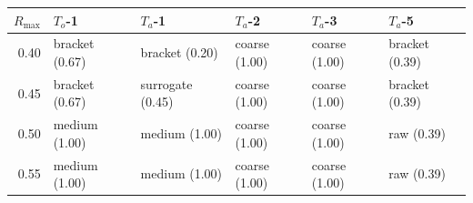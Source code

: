 \begin{tabular}{@{}rlllll@{}}
\toprule
$R_{\max}$ & $T_o$-1 & $T_a$-1 & $T_a$-2 & $T_a$-3 & $T_a$-5 \\
\midrule
0.40 & bracket (0.67) & bracket (0.20) & coarse (1.00) & coarse (1.00) & bracket (0.39) \\
0.45 & bracket (0.67) & surrogate (0.45) & coarse (1.00) & coarse (1.00) & bracket (0.39) \\
0.50 & medium (1.00) & medium (1.00) & coarse (1.00) & coarse (1.00) & raw (0.39) \\
0.55 & medium (1.00) & medium (1.00) & coarse (1.00) & coarse (1.00) & raw (0.39) \\
\bottomrule
\end{tabular}
